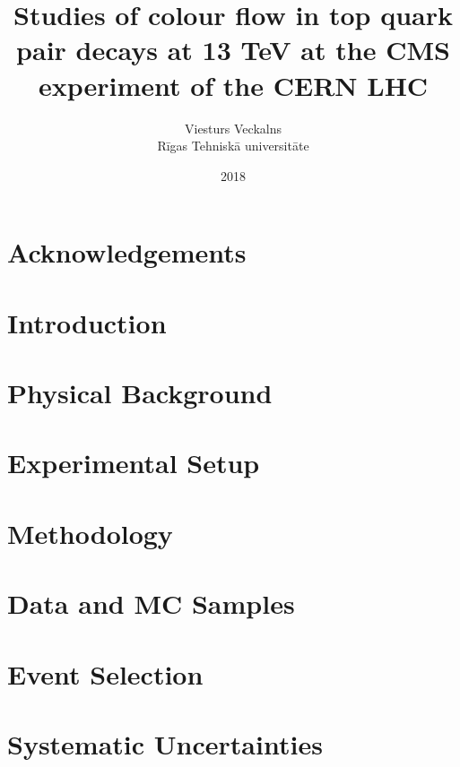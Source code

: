 \documentclass[titlepage, a4paper]{report}
\title{Studies of colour flow in top quark pair decays at 13 TeV at the CMS experiment of the CERN LHC}
\author{Viesturs Veckalns\\Rīgas Tehniskā universitāte}
\date{2018}
\begin{document}
\maketitle
\begin{abstract}
        
\end{abstract}

\chapter*{Acknowledgements}
\label{chap:acknowledgements}


\tableofcontents
\listoffigures
\listoftables

\chapter{Introduction}
\label{chap:introduction}


\chapter{Physical Background}


\chapter{Experimental Setup}


\chapter{Methodology}
\label{chap:methodology}


\chapter{Data and MC Samples}


\chapter{Event Selection}
\label{chap:event_selection}


\chapter{Systematic Uncertainties}
\label{chap:systematic_uncertainties}

\end{document}
